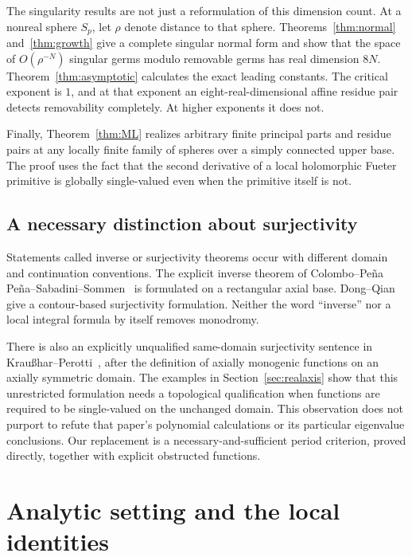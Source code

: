 \documentclass[11pt,a4paper]{article}
\numberwithin{equation}{section}
\theoremstyle{definition}
\theoremstyle{remark}
\begin{document}
The singularity results are not just a reformulation of this dimension count.
At a nonreal sphere $S_p$, let $\rho$ denote distance to that sphere.
Theorems~\ref{thm:normal} and~\ref{thm:growth} give a complete singular normal
form and show that the space of $O(\rho^{-N})$ singular germs modulo removable
germs has real dimension $8N$. Theorem~\ref{thm:asymptotic} calculates the exact
leading constants. The critical exponent is $1$, and at that exponent an
eight-real-dimensional affine residue pair detects removability completely.
At higher exponents it does not.

Finally, Theorem~\ref{thm:ML} realizes arbitrary finite principal parts and
residue pairs at any locally finite family of spheres over a simply connected
upper base. The proof uses the fact that the second derivative of a local
holomorphic Fueter primitive is globally single-valued even when the primitive
itself is not.

\subsection{A necessary distinction about surjectivity}
\label{subsec:surjectivity-context}

Statements called inverse or surjectivity theorems occur with different domain
and continuation conventions. The explicit inverse theorem of
Colombo--Pe\~na Pe\~na--Sabadini--Sommen~\cite[Theorem~3]{CPSS} is formulated on
a rectangular axial base. Dong--Qian~\cite[Theorem~3.6]{DQ} give a
contour-based surjectivity formulation. Neither the word ``inverse'' nor a
local integral formula by itself removes monodromy.

There is also an explicitly unqualified same-domain surjectivity sentence in
Krau\ss har--Perotti~\cite[\S4, p.~2539, before Proposition~24]{KP}, after the
definition of axially monogenic functions on an axially symmetric domain.
The examples in Section~\ref{sec:realaxis} show that this unrestricted
formulation needs a topological qualification when functions are required to
be single-valued on the unchanged domain. This observation does not purport
to refute that paper's polynomial calculations or its particular eigenvalue
conclusions. Our replacement is a necessary-and-sufficient period criterion,
proved directly, together with explicit obstructed functions.

\section{Analytic setting and the local identities}
\label{sec:setting}
\end{document}

